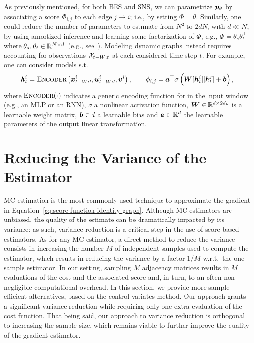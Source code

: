 As previously mentioned, for both BES and SNS, we can parametrize ${{\bm{p}}_\theta}$ by associating a score $\Phi_{i,j}$ to each edge $j\to i$; i.e., by setting $\Phi = \theta$.  
Similarly, one could reduce the number of parameters to estimate from $N^2$ to $2dN$, with $d\ll N$, by using amortized inference and learning some factorization of $\Phi$, e.g., $\Phi = \theta_s \theta_t^\top$ where $\theta_s, \theta_t \in {\mathbb{R}}^{N\times d}$~(e.g., see~\citealt{kipf2016variational, kipf2018neural}). Modeling dynamic graphs instead requires accounting for observations ${\mathcal{X}}_{t-W:t}$ at each considered time step $t$. For example, one can consider models s.t.\
 \begin{equation}\label{e:phi}
     {\bm{h}}^i_t = \textsc{Encoder}\left({\bm{x}}^i_{t-W: t}, {\bm{u}}^i_{t-W: t}, {\bm{v}}^i\right), \qquad \phi_{i,j} = {\bm{a}}^\top\sigma\left({\bm{W}} [{\bm{h}}^i_t \vert\vert {\bm{h}}^j_t] + {\bm{b}}\right),
 \end{equation}
 where $\textsc{Encoder}(\cdot)$ indicates a generic encoding function for in the input window (e.g., an MLP or an RNN), $\sigma$ a nonlinear activation function, ${\bm{W}}\in {\mathbb{R}}^{d\times 2d_h}$ is a learnable weight matrix, ${\bm{b}}\in d$ a learnable bias and ${\bm{a}} \in {\mathbb{R}}^{d}$ the learnable parameters of the output linear transformation.



\section{Reducing the Variance of the Estimator}\label{s:variance}

MC estimation is the most commonly used technique to approximate the gradient in Equation~\eqref{eq:score-function-identity-graph}. Although MC estimators are unbiased, the quality of the estimate can be dramatically impacted by its variance:
as such, variance reduction is a critical step in the use of score-based estimators. As for any MC estimator, a direct method to reduce the variance consists in increasing the number $M$ of independent samples used to compute the estimator, which results in reducing the variance by a factor $1/M$ w.r.t.\ the one-sample estimator. In our setting, sampling $M$ adjacency matrices results in $M$ evaluations of the cost and the associated score and, in turn, to an often non-negligible computational overhead. In this section, we provide more sample-efficient alternatives, based on the control variates method. Our approach grants a significant variance reduction while requiring only one extra evaluation of the cost function. That being said, our approach to variance reduction is orthogonal to increasing the sample size, which remains viable to further improve the quality of the gradient estimator.


